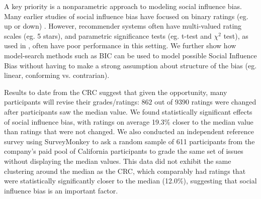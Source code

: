 \vspace{1em}

A key priority is a nonparametric approach to modeling 
social influence bias. Many earlier studies of social influence
bias have focused on binary ratings (eg. up or down) \cite{muchnik2013social, zhu2012switch}.  
However, recommender systems often have multi-valued rating scales (eg. 5 stars), 
and parametric significance tests (eg. t-test and $\chi^2$ test), as used in
\cite{cosley2003seeing}, often have poor performance in this setting.
We further show how model-search methods such as BIC can be used to model
possible Social Influence Bias without having to make a strong assumption 
about structure of the bias (eg. linear, conforming vs. contrarian).



Results to date from the CRC suggest that given the opportunity, many
participants will revise their grades/ratings: $862$ out of $9390$
ratings were changed after participants saw the median value.  We
found statistically significant effects of social influence bias, with
ratings on average 19.3\% closer to the median value than ratings that
were not changed.  We also conducted an independent reference survey
using SurveyMonkey to ask a random sample of 611 participants from the
company's paid pool of California participants to grade the same set
of issues without displaying the median values.  This data did not
exhibit the same clustering around the median as the CRC, which
comparably had ratings that were statistically significantly closer to
the median (12.0\%), suggesting that social influence bias is an
important factor.


